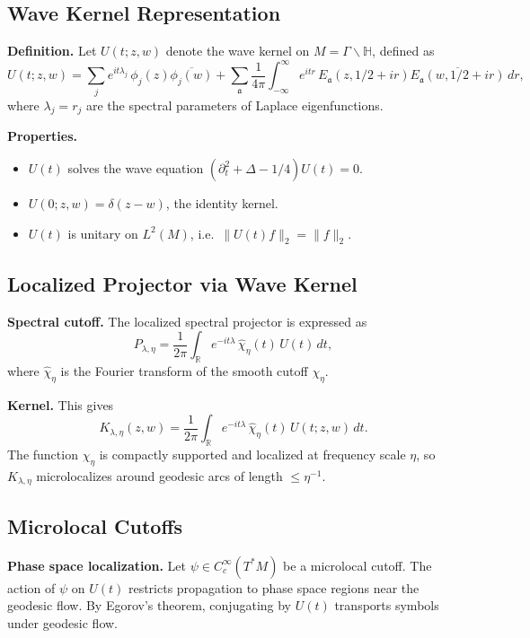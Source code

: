 \subsection{Wave Kernel Representation}

\noindent\textbf{Definition.}
Let $U(t;z,w)$ denote the wave kernel on $M = \Gamma\backslash \mathbb{H}$, defined as
\[
  U(t;z,w) = \sum_j e^{it\lambda_j}\, \phi_j(z)\overline{\phi_j(w)}
  + \sum_\mathfrak{a} \frac{1}{4\pi}\int_{-\infty}^\infty
    e^{itr}\, E_\mathfrak{a}(z,1/2+ir)\overline{E_\mathfrak{a}(w,1/2+ir)}\, dr,
\]
where $\lambda_j = r_j$ are the spectral parameters of Laplace eigenfunctions.  

\medskip

\noindent\textbf{Properties.}
\begin{itemize}
  \item $U(t)$ solves the wave equation $(\partial_t^2 + \Delta - 1/4) U(t) = 0$.
  \item $U(0;z,w) = \delta(z-w)$, the identity kernel.
  \item $U(t)$ is unitary on $L^2(M)$, i.e.\ $\|U(t)f\|_2 = \|f\|_2$.
\end{itemize}

\subsection{Localized Projector via Wave Kernel}

\noindent\textbf{Spectral cutoff.}
The localized spectral projector is expressed as
\[
  P_{\lambda,\eta} = \frac{1}{2\pi}\int_\mathbb{R} e^{-it\lambda}\, \widehat{\chi}_\eta(t)\, U(t)\, dt,
\]
where $\widehat{\chi}_\eta$ is the Fourier transform of the smooth cutoff $\chi_\eta$.  

\noindent\textbf{Kernel.}
This gives
\[
  K_{\lambda,\eta}(z,w) = \frac{1}{2\pi}\int_\mathbb{R} e^{-it\lambda}\,
  \widehat{\chi}_\eta(t)\, U(t;z,w)\, dt.
\]
The function $\chi_\eta$ is compactly supported and localized at frequency scale $\eta$, so $K_{\lambda,\eta}$ microlocalizes around geodesic arcs of length $\leq \eta^{-1}$.

\subsection{Microlocal Cutoffs}

\noindent\textbf{Phase space localization.}
Let $\psi \in C_c^\infty(T^*M)$ be a microlocal cutoff.
The action of $\psi$ on $U(t)$ restricts propagation to phase space regions near the geodesic flow.  
By Egorov’s theorem, conjugating by $U(t)$ transports symbols under geodesic flow.

